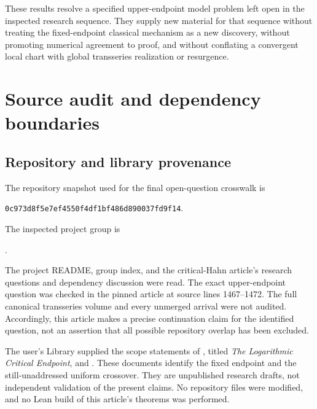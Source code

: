 \documentclass[11pt,a4paper]{article}
\numberwithin{equation}{section}
\theoremstyle{definition}
\theoremstyle{remark}
\begin{document}
These results resolve a specified upper-endpoint model problem left open in
the inspected research sequence. They supply new material for that sequence
without treating the fixed-endpoint classical mechanism as a new discovery,
without promoting numerical agreement to proof, and without conflating a
convergent local chart with global transseries realization or resurgence.

\appendix
\section{Source audit and dependency boundaries}
\label{app:provenance}

\subsection{Repository and library provenance}
The repository snapshot used for the final open-question crosswalk is
\begin{center}
\small\texttt{0c973d8f5e7ef4550f4df1bf486d890037fd9f14}.
\end{center}
The inspected project group is
\begin{center}
\small{}.
\end{center}
The project README, group index, and the critical-Hahn article's research
questions and dependency discussion were read. The exact upper-endpoint
question was checked in the pinned article at source lines 1467--1472.
The full canonical transseries volume and every unmerged arrival were not
audited. Accordingly, this article makes a precise continuation claim for the
identified question, not an assertion that all possible repository overlap
has been excluded.

The user's Library supplied the scope statements of
, titled \emph{The Logarithmic Critical
Endpoint}, and . These documents
identify the fixed endpoint and the still-unaddressed uniform crossover.
They are unpublished research drafts, not independent validation of the
present claims. No repository files were modified, and no Lean build of this
article's theorems was performed.
\end{document}
